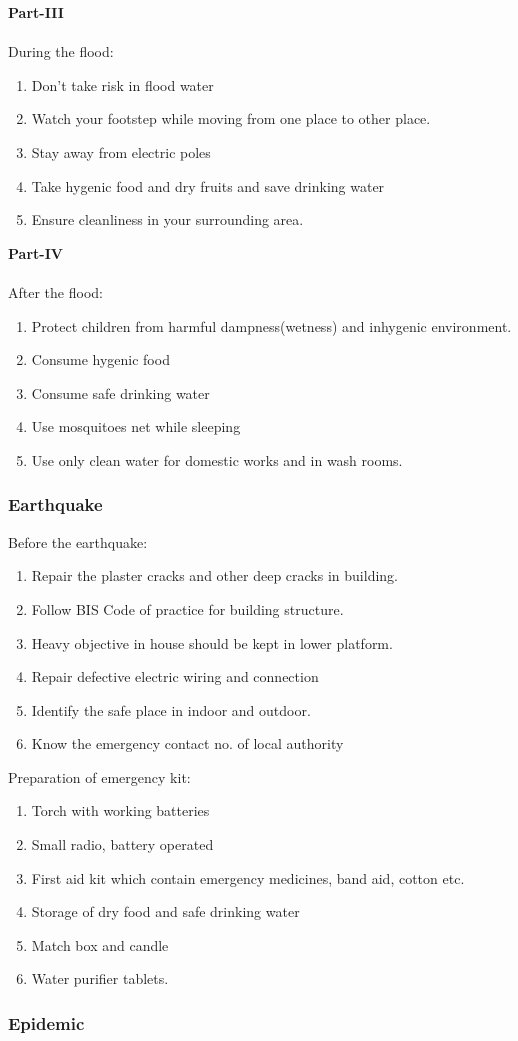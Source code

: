 \documentclass[12pt,a4paper]{article}
\begin{document}
\textbf{Part-III}\\ \\
During the flood: 
\begin{enumerate}
	\item Don't take risk in flood water
	\item Watch your footstep while moving from one place to other place.
	\item Stay away from electric poles
	\item Take hygenic food and dry fruits and save drinking water
	\item Ensure cleanliness in your surrounding area.
\end{enumerate}

\textbf{Part-IV}\\ \\
After the flood: 
\begin{enumerate}
	\item Protect children from harmful dampness(wetness) and inhygenic environment.
	\item Consume hygenic food
	\item Consume safe drinking water
	\item Use mosquitoes net while sleeping
	\item Use only clean water for domestic works and in wash rooms.
\end{enumerate}

\subsubsection*{Earthquake}
Before the earthquake:
\begin{enumerate}
	\item Repair the plaster cracks and other deep cracks in building.
	\item Follow BIS Code of practice for building structure.
	\item Heavy objective in house should be kept in lower platform.
	\item Repair defective electric wiring and connection
	\item Identify the safe place in indoor and outdoor.
	\item Know the emergency contact no. of local authority
\end{enumerate}

Preparation of emergency kit:
\begin{enumerate}
	\item Torch with working batteries
	\item Small radio, battery operated
	\item First aid kit which contain emergency medicines, band aid, cotton etc.
	\item Storage of dry food and safe drinking water
	\item Match box and candle
	\item Water purifier tablets.
\end{enumerate}
\subsubsection*{Epidemic}





  
\end{document}
